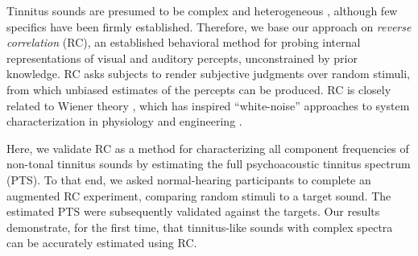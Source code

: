 \documentclass[journal]{IEEEtran}
\begin{document}
Tinnitus sounds are presumed to be complex and heterogeneous
\cite{vajsakovicPrinciplesMethodsPsychoacoustic2021,henryTinnitusEpidemiologicPerspective2020,meikleTinnitusArchiveArchive2004},
although few specifics have been firmly established.
Therefore, we base our approach on \textit{reverse correlation} (RC),
an established behavioral method
\cite{ahumadaStimulusFeaturesSignal1971,gosselinSuperstitiousPerceptionsReveal2003,brimijoinInternalRepresentationVowel2013}
for probing internal representations of visual and auditory percepts, unconstrained by prior knowledge.
RC asks subjects to render subjective judgments over random stimuli, 
from which unbiased estimates of the percepts can be produced.
RC is closely related to Wiener theory \cite{wienerNonlinearProblemsRandom1966},
which has inspired ``white-noise'' approaches to system characterization in physiology
\cite{ringachReverseCorrelationNeurophysiology2004,marmarelisWhiteNoiseMethodSystem1978} and engineering \cite{ljungMeasureLackFit1978}.

Here, we validate RC as a method for characterizing all component
frequencies of non-tonal tinnitus sounds
by estimating the full psychoacoustic tinnitus spectrum (PTS).
To that end, we asked normal-hearing participants to complete an augmented RC experiment, comparing random stimuli to a target sound.
The estimated PTS were subsequently validated against the targets.
Our results demonstrate, for the first time, that tinnitus-like sounds with complex spectra can be accurately estimated using RC. 


% 
% 
% 
% 
\end{document}
